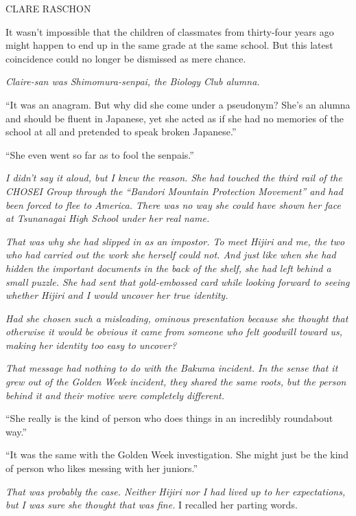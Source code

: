 \documentclass[
    a4paper,
    12pt,
    twoside,
    openany,
    UTF8,
    fontset=windows
]{ctexbook}
\begin{document}
\begin{center}
CLARE RASCHON
\end{center}

It wasn't impossible that the children of classmates from thirty-four years ago might happen to end up in the same grade at the same school. But this latest coincidence could no longer be dismissed as mere chance.

\textit{Claire-san was Shimomura-senpai, the Biology Club alumna.}

``It was an anagram. But why did she come under a pseudonym? She's an alumna and should be fluent in Japanese, yet she acted as if she had no memories of the school at all and pretended to speak broken Japanese.''

``She even went so far as to fool the senpais.''

\textit{I didn't say it aloud, but I knew the reason. She had touched the third rail of the CHOSEI Group through the ``Bandori Mountain Protection Movement'' and had been forced to flee to America. There was no way she could have shown her face at Tsunanagai High School under her real name.}

\textit{That was why she had slipped in as an impostor. To meet Hijiri and me, the two who had carried out the work she herself could not. And just like when she had hidden the important documents in the back of the shelf, she had left behind a small puzzle. She had sent that gold-embossed card while looking forward to seeing whether Hijiri and I would uncover her true identity.}

\textit{Had she chosen such a misleading, ominous presentation because she thought that otherwise it would be obvious it came from someone who felt goodwill toward us, making her identity too easy to uncover?}

\textit{That message had nothing to do with the Bakuma incident. In the sense that it grew out of the Golden Week incident, they shared the same roots, but the person behind it and their motive were completely different.}

``She really is the kind of person who does things in an incredibly roundabout way.''

``It was the same with the Golden Week investigation. She might just be the kind of person who likes messing with her juniors.''

\textit{That was probably the case. Neither Hijiri nor I had lived up to her expectations, but I was sure she thought that was fine.} I recalled her parting words.
\end{document}
